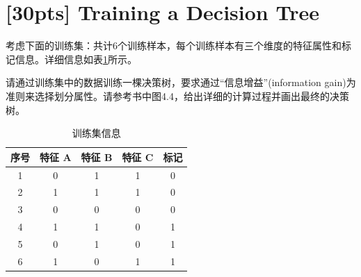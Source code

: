 \documentclass[a4paper,UTF8]{article}
\numberwithin{equation}{section}
\theoremstyle{definition}
\begin{document}
\section{[30pts] Training a Decision Tree}
考虑下面的训练集：共计6个训练样本，每个训练样本有三个维度的特征属性和标记信息。详细信息如表\ref{table:training}所示。

请通过训练集中的数据训练一棵决策树，要求通过“信息增益”(information gain)为准则来选择划分属性。请参考书中图4.4，给出详细的计算过程并画出最终的决策树。
\begin{table}[h]
\centering
\caption{训练集信息}
\label{table:training}\vspace{2mm} 
\begin{tabular}{c|c c c|c}\hline
序号		&  特征 \textbf{A} 	&	特征 \textbf{B}	&	特征 \textbf{C} 	&	标记    \\ \hline
1		&  0 	&	1	&	1 	&	0    \\
2		&  1 	&	1 	&	1 	&	0    \\
3		&  0 	&	0 	&	0 	&	0    \\
4		&  1 	&	1 	&	0 	&	1    \\
5		&  0 	&	1 	&	0 	&	1    \\
6		&  1 	&	0 	&	1 	&	1    \\\hline
\end{tabular} 
\end{table}
\end{document}
